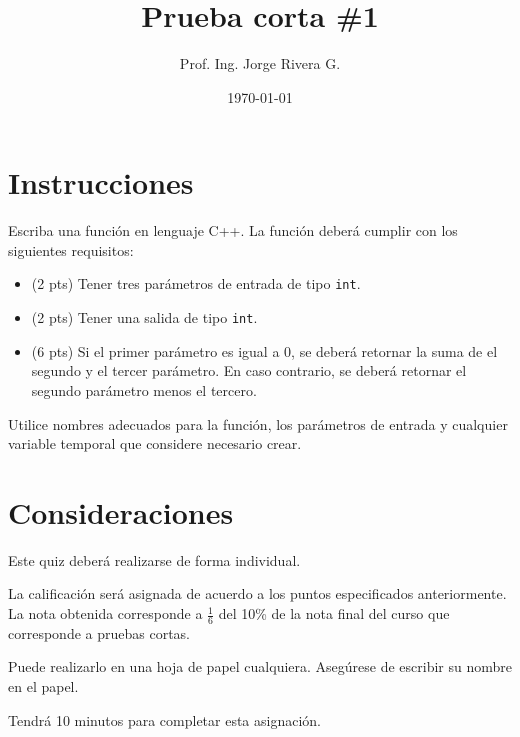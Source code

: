 \documentclass[letterpaper,12pt]{IEEEtran}
\title{Prueba corta \#1}
\author{Prof. Ing. Jorge Rivera G.}
\date{\today}
\begin{document}
\maketitle

\section{Instrucciones}

Escriba una función en lenguaje C++. La función deberá cumplir con los siguientes requisitos:

\begin{itemize}
	\item (2 pts) Tener tres parámetros de entrada de tipo {\tt int}. 
	\item (2 pts) Tener una salida de tipo {\tt int}.
	\item (6 pts) Si el primer parámetro es igual a 0, se deberá retornar la suma de el segundo y el tercer parámetro. En caso contrario, se deberá retornar el segundo parámetro menos el tercero.
\end{itemize}

Utilice nombres adecuados para la función, los parámetros de entrada y cualquier variable temporal que considere necesario crear.

\newpage

\section{Consideraciones}

Este quiz deberá realizarse de forma individual. 

La calificación será asignada de acuerdo a los puntos especificados anteriormente. La nota obtenida corresponde a $\frac{1}{6}$ del 10\% de la nota final del curso que corresponde a pruebas cortas.

Puede realizarlo en una hoja de papel cualquiera.  Asegúrese de escribir su nombre en el papel.

Tendrá 10 minutos para completar esta asignación.
\end{document}

